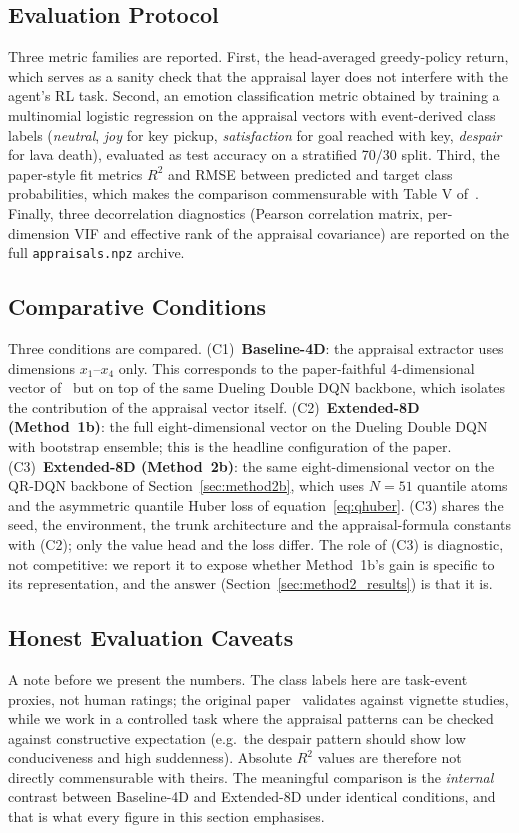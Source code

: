 \documentclass[conference]{IEEEtran}
\begin{document}
\subsection{Evaluation Protocol}
Three metric families are reported. First, the head-averaged greedy-policy
return, which serves as a sanity check that the appraisal layer does not
interfere with the agent's RL task. Second, an emotion classification metric
obtained by training a multinomial logistic regression on the appraisal
vectors with event-derived class labels (\emph{neutral}, \emph{joy} for key
pickup, \emph{satisfaction} for goal reached with key, \emph{despair} for
lava death), evaluated as test accuracy on a stratified 70/30 split. Third,
the paper-style fit metrics $R^{2}$ and RMSE between predicted and target
class probabilities, which makes the comparison commensurable with Table V
of~\cite{zhang2023modeling}. Finally, three decorrelation
diagnostics (Pearson correlation matrix, per-dimension VIF and effective
rank of the appraisal covariance) are reported on the full
\texttt{appraisals.npz} archive.

\subsection{Comparative Conditions}
Three conditions are compared.
(C1)~\textbf{Baseline-4D}: the appraisal extractor uses dimensions
$x_{1}$--$x_{4}$ only. This corresponds to the paper-faithful 4-dimensional
vector of~\cite{zhang2023modeling} but on top of the same Dueling Double DQN
backbone, which isolates the contribution of the appraisal vector itself.
(C2)~\textbf{Extended-8D (Method~1b)}: the full eight-dimensional vector on
the Dueling Double DQN with bootstrap ensemble; this is the headline
configuration of the paper.
(C3)~\textbf{Extended-8D (Method~2b)}: the same eight-dimensional vector
on the QR-DQN backbone of Section~\ref{sec:method2b}, which uses $N{=}51$
quantile atoms and the asymmetric quantile Huber loss of
equation~\eqref{eq:qhuber}. (C3) shares the seed, the environment, the
trunk architecture and the appraisal-formula constants with (C2); only
the value head and the loss differ. The role of (C3) is diagnostic,
not competitive: we report it to expose whether Method~1b's gain is
specific to its representation, and the answer (Section~\ref{sec:method2_results})
is that it is.

\subsection{Honest Evaluation Caveats}
\label{sec:caveats}
A note before we present the numbers. The class labels here are
task-event proxies, not human ratings; the original paper~\cite{zhang2023modeling}
validates against vignette studies, while we work in a controlled task
where the appraisal patterns can be checked against constructive
expectation (e.g.\ the despair pattern should show low conduciveness and
high suddenness). Absolute $R^{2}$ values are therefore not directly
commensurable with theirs. The meaningful comparison is the
\emph{internal} contrast between Baseline-4D and Extended-8D under
identical conditions, and that is what every figure in this section
emphasises.
\end{document}
